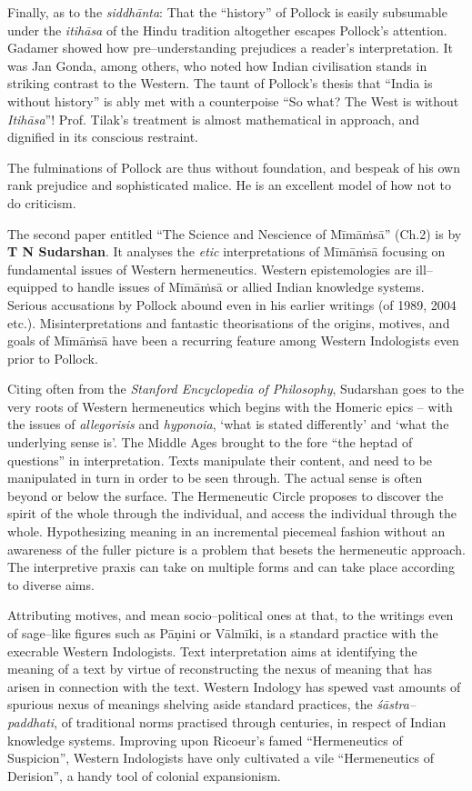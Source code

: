 Finally, as to the \textit{siddhānta}: That the “history” of Pollock is easily subsumable under the \textit{itihāsa} of the Hindu tradition altogether escapes Pollock's attention. Gadamer showed how pre–understanding prejudices a reader’s interpretation. It was Jan Gonda, among others, who noted how Indian civilisation stands in striking contrast to the Western. The taunt of Pollock’s thesis that “India is without history” is ably met with a counterpoise “So what? The West is without \textit{Itihāsa}”! Prof. Tilak’s treatment is almost mathematical in approach, and dignified in its conscious restraint. 

The fulminations of Pollock are thus without foundation, and bespeak of his own rank prejudice and sophisticated malice. He is an excellent model of how not to do criticism.

The second paper entitled “The Science and Nescience of Mīmāṁsā” (Ch.2) is by \textbf{T N Sudarshan}. It analyses the \textit{etic} interpretations of Mīmāṁsā focusing on fundamental issues of Western hermeneutics. Western epistemologies are ill–equipped to handle issues of Mīmāṁsā or allied Indian knowledge systems. Serious accusations by Pollock abound even in his earlier writings (of 1989, 2004 etc.). Misinterpretations and fantastic theorisations of the origins, motives, and goals of Mīmāṁsā have been a recurring feature among Western Indologists even prior to Pollock. 

Citing often from the \textit{Stanford Encyclopedia of Philosophy}, Sudarshan goes to the very roots of Western hermeneutics which begins with the Homeric epics – with the issues of \textit{allegorisis} and \textit{hyponoia}, ‘what is stated differently’ and ‘what the underlying sense is’. The Middle Ages brought to the fore “the heptad of questions” in interpretation. Texts manipulate their content, and need to be manipulated in turn in order to be seen through. The actual sense is often beyond or below the surface. The Hermeneutic Circle proposes to discover the spirit of the whole through the individual, and access the individual through the whole. Hypothesizing meaning in an incremental piecemeal fashion without an awareness of the fuller picture is a problem that besets the hermeneutic approach. The interpretive praxis can take on multiple forms and can take place according to diverse aims.

 Attributing motives, and mean socio–political ones at that, to the writings even of sage–like figures such as Pāṇini or Vālmīki, is a standard practice with the execrable Western Indologists. Text interpretation aims at identifying the meaning of a text by virtue of reconstructing the nexus of meaning that has arisen in connection with the text. Western Indology has spewed vast amounts of spurious nexus of meanings shelving aside standard practices, the \textit{śāstra–paddhati}, of traditional norms practised through centuries, in respect of Indian knowledge systems. Improving upon Ricoeur’s famed “Hermeneutics of Suspicion”, Western Indologists have only cultivated a vile “Hermeneutics of Derision”, a handy tool of colonial expansionism. 

